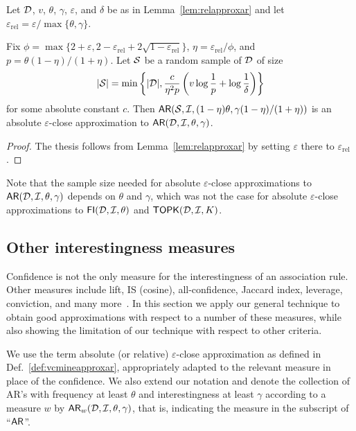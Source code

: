 \begin{lemma}\label{lem:absapproxar}
Let ${\cal D}$, $v$, $\theta$, $\gamma$, $\varepsilon$, and $\delta$ be as in
Lemma~\ref{lem:relapproxar}
and let $\varepsilon_\mathrm{rel}=\varepsilon/\max\{\theta,\gamma\}$.

Fix
$\phi=\max\{2+\varepsilon,2-\varepsilon_\mathrm{rel}+2\sqrt{1-\varepsilon_\mathrm{rel}}\}$,
$\eta=\varepsilon_\mathrm{rel}/\phi$,
and $p=\theta(1-\eta)/(1+\eta)$. Let ${\cal S}$ be a random sample of ${\cal D}$ of
size 
\begin{equation}\label{eq:vcminesamsizeabsapproxar}
|{\cal S}|=\min\left\{|{\cal D}|,\frac{c}{\eta^2p}\left(v\log\frac{1}{p}+\log\frac{1}{\delta}\right)\right\}
\end{equation}
for some absolute constant $c$. Then
$\mathsf{AR}({\cal S},{\cal I},(1-\eta)\theta,\gamma(1-\eta)/(1+\eta))$ is an absolute
$\varepsilon$-close approximation to $\mathsf{AR}({\cal D},{\cal I},\theta,\gamma)$.
\end{lemma}

\begin{proof}
  The thesis follows from Lemma~\ref{lem:relapproxar} by setting $\varepsilon$
  there to $\varepsilon_\mathrm{rel}$.
\end{proof}

Note that the sample size needed for absolute $\varepsilon$-close
approximations to $\mathsf{AR}({\cal D},{\cal I},\theta,\gamma)$ depends on $\theta$ and
$\gamma$, which was not the case for absolute $\varepsilon$-close approximations
to $\mathsf{FI}({\cal D},{\cal I},\theta)$ and $\mathsf{TOPK}({\cal D},{\cal I},K)$.

\subsection{Other interestingness measures}\label{sec:vcminealternative}
Confidence is not the only
measure for the interestingness of an association rule. Other measures include
lift, IS (cosine), all-confidence, Jaccard index, leverage, conviction, and many
more~\cite{TanKS04}. In this section we apply our general technique to obtain good approximations with 
respect to a number of these measures, while also showing the limitation of our technique
with respect to other criteria.

We use the term absolute (or relative) $\varepsilon$-close approximation as
defined in Def.~\ref{def:vcmineapproxar}, appropriately adapted to the relevant
measure in place of the confidence. We also extend our notation and denote the
collection of AR's with frequency at least $\theta$ and interestingness at least
$\gamma$ according to a measure $w$ by $\mathsf{AR}_w({\cal D},{\cal I},\theta,\gamma)$, that is,
indicating the measure in the subscript of ``$\mathsf{AR}$''.

